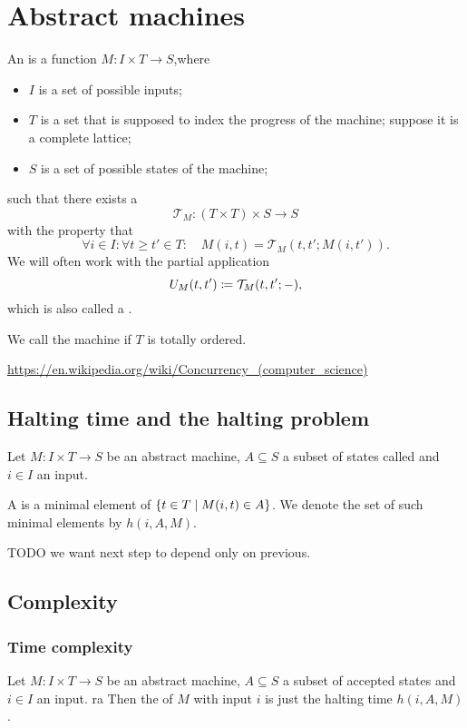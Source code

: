 \section{Abstract machines}
\begin{definition}
An  is a function $M: I\times T \to S$,where
\begin{itemize}
\item $I$ is a set of possible inputs;
\item $T$ is a set that is supposed to index the progress of the machine; suppose it is a complete lattice;
\item $S$ is a set of possible states of the machine;
\end{itemize}
such that there exists a 
\[ \mathcal{T}_M: (T\times T)\times S \to S \]
with the property that
\[ \forall i\in I: \forall t \geq t'\in T: \quad M(i,t) = \mathcal{T}_M(t,t'; M(i,t')). \]
We will often work with the partial application
\[ U_M(t,t') \coloneqq \mathcal{T}_M(t,t'; -), \]
which is also called a .

We call the machine  if $T$ is totally ordered.
\end{definition}

\url{https://en.wikipedia.org/wiki/Concurrency_(computer_science)}

\subsection{Halting time and the halting problem}
\begin{definition}
Let $M: I\times T \to S$ be an abstract machine, $A \subseteq S$ a subset of states called  and $i\in I$ an input.

A  is a minimal element of $\left\{ t\in T \;\middle|\; M(i,t) \in A \right\}$. We denote the set of such minimal elements by $h(i, A, M)$.
\end{definition}

TODO we want next step to depend only on previous.

\subsection{Complexity}
\subsubsection{Time complexity}
\begin{definition}
Let  $M: I\times T \to S$ be an abstract machine, $A \subseteq S$ a subset of accepted states and $i\in I$ an input.
ra
Then the  of $M$ with input $i$ is just the halting time $h(i,A, M)$.
\end{definition}


